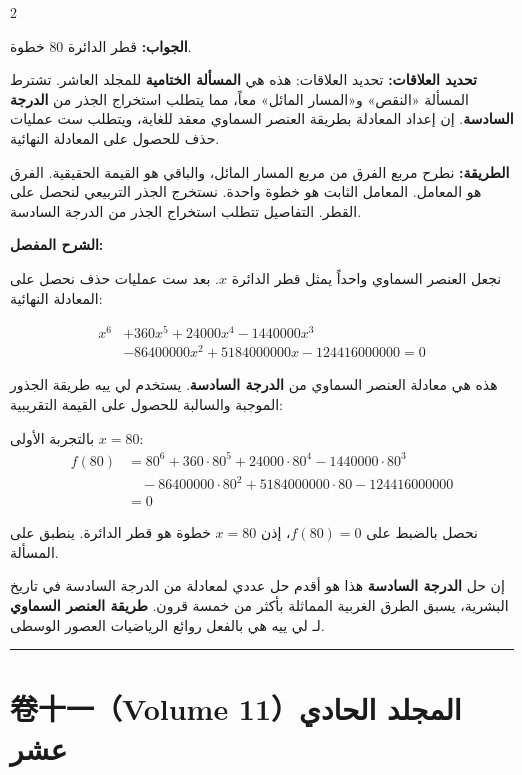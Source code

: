 \documentclass[11pt,a4paper]{article}
\newcommand{\ar}[1]{\arabicfont\beginR #1\endR}
\newcommand{\arb}[1]{\textbf{\arabicfont\beginR #1\endR}}
\newcommand{\longline}{\noindent\rule{\textwidth}{0.4pt}}
\newcommand{\arnote}[1]{\textcolor{arabicblue}{\ar{#1}}}
\newcommand{\arjwb}[1]{\par\noindent\arb{الجواب: }\arnote{#1}\par}
\newcommand{\arqwd}[1]{\par\noindent\arb{الطريقة: }\arnote{#1}\par}
\newcommand{\arshr}[1]{\par\noindent\arb{الشرح المفصل: }\arnote{#1}\par}
\newcommand{\arfl}[1]{\par\noindent\arb{تحديد العلاقات: }\arnote{#1}\par}
\begin{document}
\begin{paracol}{2}
\begin{rightcolumn}
\arjwb{قطر الدائرة 80 خطوة.}

\arfl{تحديد العلاقات: هذه هي \textbf{المسألة الختامية} للمجلد العاشر. تشترط المسألة «النقص» و«المسار المائل» معاً، مما يتطلب استخراج الجذر من \textbf{الدرجة السادسة}. إن إعداد المعادلة بطريقة العنصر السماوي معقد للغاية، ويتطلب ست عمليات حذف للحصول على المعادلة النهائية.}

\arqwd{نطرح مربع الفرق من مربع المسار المائل، والباقي هو القيمة الحقيقية. الفرق هو المعامل. المعامل الثابت هو خطوة واحدة. نستخرج الجذر التربيعي لنحصل على القطر. التفاصيل تتطلب استخراج الجذر من الدرجة السادسة.}

\arshr{نجعل العنصر السماوي واحداً يمثل قطر الدائرة $x$. بعد ست عمليات حذف نحصل على المعادلة النهائية:

\begin{align*}
x^6 &+ 360x^5 + 24000x^4 - 1440000x^3 \\
&- 86400000x^2 + 5184000000x - 124416000000 = 0
\end{align*}

هذه هي معادلة العنصر السماوي من \textbf{الدرجة السادسة}. يستخدم لي ييه طريقة الجذور الموجبة والسالبة للحصول على القيمة التقريبية:

بالتجربة الأولى $x = 80$:
\begin{align*}
f(80) &= 80^6 + 360 \cdot 80^5 + 24000 \cdot 80^4 - 1440000 \cdot 80^3 \\
&\quad - 86400000 \cdot 80^2 + 5184000000 \cdot 80 - 124416000000 \\
&= 0
\end{align*}

نحصل بالضبط على $f(80) = 0$، إذن $x = 80$ خطوة هو قطر الدائرة. ينطبق على المسألة.

إن حل \textbf{الدرجة السادسة} هذا هو أقدم حل عددي لمعادلة من الدرجة السادسة في تاريخ البشرية، يسبق الطرق الغربية المماثلة بأكثر من خمسة قرون. \textbf{طريقة العنصر السماوي} لـ لي ييه هي بالفعل روائع الرياضيات العصور الوسطى.}
\end{rightcolumn}

\end{paracol}

\vspace{0.3cm}
\longline

\newpage

\section{卷十一（Volume 11）\hfill \ar{المجلد الحادي عشر}}
\label{sec:vol11}
\end{document}
